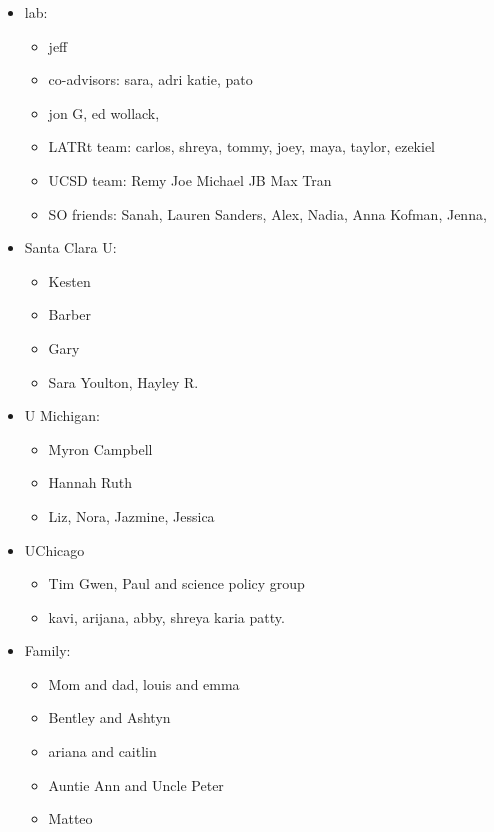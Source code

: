 \documentclass{ucetd}
\begin{document}
\begin{itemize}

\item lab: \begin{itemize}
        \item jeff
        \item co-advisors: sara, adri katie, pato
        \item jon G, ed wollack,
        \item LATRt team: carlos, shreya, tommy, joey, maya, taylor, ezekiel
        \item UCSD team: Remy Joe Michael JB Max Tran
        \item SO friends: Sanah, Lauren Sanders, Alex, Nadia, Anna Kofman, Jenna,
    \end{itemize}
    \item Santa Clara U: \begin{itemize}
        \item Kesten
        \item Barber
        \item Gary
        \item Sara Youlton, Hayley R.
    \end{itemize}
    \item U Michigan: \begin{itemize}
        \item Myron Campbell
        \item Hannah Ruth
        \item Liz, Nora, Jazmine, Jessica
    \end{itemize}
    
    \item UChicago\begin{itemize}
        \item Tim Gwen, Paul and science policy group
        \item kavi, arijana, abby, shreya karia patty.
    \end{itemize}
    \item Family: \begin{itemize}
        \item Mom and dad, louis and emma
        \item Bentley and Ashtyn
        \item ariana and caitlin
        \item Auntie Ann and Uncle Peter
        \item Matteo
    \end{itemize}

\end{itemize}
\end{document}
